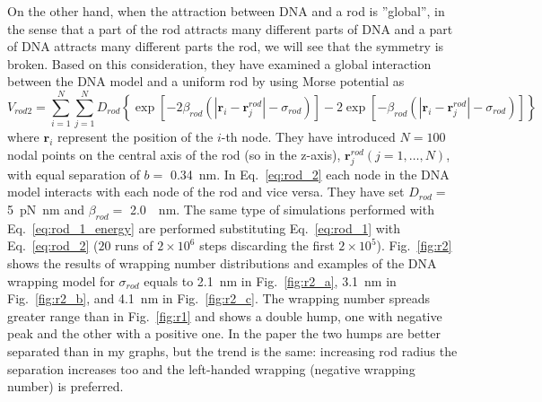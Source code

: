 \documentclass[a4paper,10pt]{article}
\begin{document}
On the other hand, when the attraction between DNA and a rod is ''global'', in the sense that a part of the rod attracts many different parts of DNA and a part of DNA attracts many different parts the rod, we will see that the symmetry is broken.
Based on this consideration, they have examined a global interaction between the DNA model and a uniform rod by using Morse potential as
\begin{equation}\label{eq:rod_2}
V_{rod2}=\sum^{N}_{i=1}\sum^{N}_{j=1}D_{rod}\left \{\exp\left [-2\beta_{rod}\left (\left |\textbf{r}_{i}-\textbf{r}_{j}^{rod}\right |-\sigma_{rod}\right )\right ]-2\exp\left [-\beta_{rod}\left (\left |\textbf{r}_{i}-\textbf{r}_{j}^{rod}\right |-\sigma_{rod}\right )\right ]\right \}
\end{equation}
where $\textbf{r}_{i}$ represent the position of the $i$-th node.
They have introduced $N=100$ nodal points on the central axis of the rod (so in the z-axis), $\textbf{r}_{j}^{rod} \left (j=1,\dots,N\right )$, with equal separation of $b=$ \SI{.34}{\nm}.
In Eq.~\ref{eq:rod_2} each node in the DNA model interacts with each node of the rod and vice versa.
They have set $D_{rod}=$ \SI{5}{\pico\newton\nano\meter} and $\beta_{rod}=$ \SI{2.0}{\per\nm}.
The same type of simulations performed with Eq.~\ref{eq:rod_1_energy} are performed substituting Eq.~\ref{eq:rod_1} with Eq.~\ref{eq:rod_2} ($20$ runs of $2\times 10^6$ steps discarding the first $2\times 10^5$).
Fig.~\ref{fig:r2} shows the results of wrapping number distributions and examples of the DNA wrapping model for $\sigma_{rod}$ equals to \SI{2.1}{\nm} in Fig.~\ref{fig:r2_a}, \SI{3.1}{\nm} in Fig.~\ref{fig:r2_b}, and \SI{4.1}{\nm} in Fig.~\ref{fig:r2_c}.
The wrapping number spreads greater range than in Fig.~\ref{fig:r1} and shows a double hump, one with negative peak and the other with a positive one.
In the paper the two humps are better separated than in my graphs, but the trend is the same: increasing rod radius the separation increases too and the left-handed wrapping (negative wrapping number) is preferred.
\end{document}
